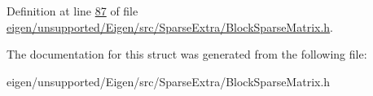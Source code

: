 Definition at line \hyperlink{eigen_2unsupported_2_eigen_2src_2_sparse_extra_2_block_sparse_matrix_8h_source_l00087}{87} of file \hyperlink{eigen_2unsupported_2_eigen_2src_2_sparse_extra_2_block_sparse_matrix_8h_source}{eigen/unsupported/\+Eigen/src/\+Sparse\+Extra/\+Block\+Sparse\+Matrix.\+h}.



The documentation for this struct was generated from the following file\+:\begin{DoxyCompactItemize}
\item 
eigen/unsupported/\+Eigen/src/\+Sparse\+Extra/\+Block\+Sparse\+Matrix.\+h\end{DoxyCompactItemize}
